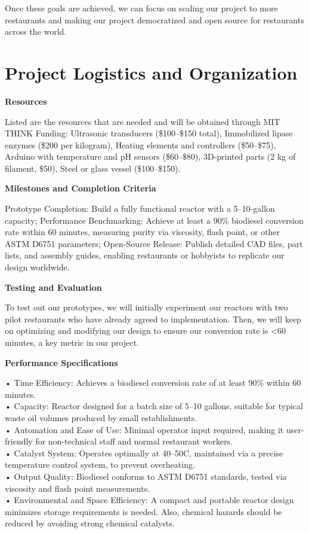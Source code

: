 \documentclass[10pt,twocolumn]{article}
\begin{document}
Once these goals are achieved, we can focus on scaling our project to more restaurants and making our project democratized and open source for restaurants across the world.

\section*{Project Logistics and Organization}

\textbf{Resources}

Listed are the resources that are needed and will be obtained through MIT THINK Funding: Ultrasonic transducers (\$100–\$150 total), Immobilized lipase enzymes (\$200 per kilogram), Heating elements and controllers (\$50–\$75), Arduino with temperature and pH sensors (\$60–\$80), 3D-printed parts (2 kg of filament, \$50), Steel or glass vessel (\$100–\$150). 

\textbf{Milestones and Completion Criteria}

Prototype Completion: Build a fully functional reactor with a 5–10-gallon capacity; Performance Benchmarking: Achieve at least a 90\% biodiesel conversion rate within 60 minutes, measuring purity via viscosity, flash point, or other ASTM D6751 parameters; Open-Source Release: Publish detailed CAD files, part lists, and assembly guides, enabling restaurants or hobbyists to replicate our design worldwide.

\textbf{Testing and Evaluation}

To test out our prototypes, we will initially experiment our reactors with two pilot restaurants who have already agreed to implementation. Then, we will keep on optimizing and modifying our design to ensure our conversion rate is <60 minutes, a key metric in our project. 

\textbf{Performance Specifications}

• Time Efficiency: Achieves a biodiesel conversion rate of at least 90\% within 60 minutes.\\
• Capacity: Reactor designed for a batch size of 5–10 gallons, suitable for typical waste oil volumes produced by small establishments.\\
• Automation and Ease of Use: Minimal operator input required, making it user-friendly for non-technical staff and normal restaurant workers.\\
• Catalyst System: Operates optimally at 40–50\degree C, maintained via a precise temperature control system, to prevent overheating.\\
• Output Quality: Biodiesel conforms to ASTM D6751 standards, tested via viscosity and flash point measurements.\\
• Environmental and Space Efficiency: A compact and portable reactor design minimizes storage requirements is needed. Also, chemical hazards should be reduced by avoiding strong chemical catalysts.
\end{document}
